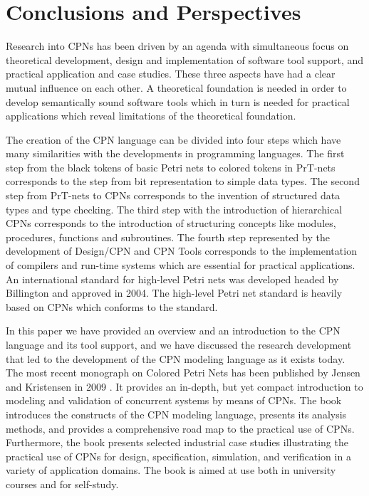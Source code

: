 \section{Conclusions and Perspectives}

Research into CPNs has been driven by an agenda with
simultaneous focus on theoretical development, design and
implementation of software tool support, and practical application and
case studies. These three aspects have had a clear mutual influence on
each other. A theoretical foundation is needed in order to develop
semantically sound software tools which in turn is needed for
practical applications which reveal limitations of the theoretical
foundation.



The creation of the CPN language can be divided into four steps which
have many similarities with the developments in programming
languages. The first step from the black tokens of basic Petri nets to
colored tokens in PrT-nets corresponds to the step from bit
representation to simple data types. The second step from PrT-nets to
CPNs corresponds to the invention of structured data types and type
checking. The third step with the introduction of hierarchical CPNs
corresponds to the introduction of structuring concepts like modules,
procedures, functions and subroutines. The fourth step represented by
the development of Design/CPN and CPN Tools corresponds to the
implementation of compilers and run-time systems which are essential
for practical applications. An international standard for high-level
Petri nets was developed headed by Billington \cite{hcpnstandard} and
approved in 2004. The high-level Petri net standard is heavily based
on CPNs which conforms to the standard.


In this paper we have provided an overview and an introduction to the
CPN language and its tool support, and we have discussed the research
development that led to the development of the CPN modeling language
as it exists today. The most recent monograph on Colored Petri Nets
has been published by Jensen and Kristensen in 2009
\cite{newcpnbook}. It provides an in-depth, but yet compact
introduction to modeling and validation of concurrent systems by means
of CPNs. The book introduces the constructs of the CPN modeling
language, presents its analysis methods, and provides a comprehensive
road map to the practical use of CPNs. Furthermore, the book presents
selected industrial case studies illustrating the practical use of
CPNs for design, specification, simulation, and verification in a
variety of application domains. The book is aimed at use both in
university courses and for self-study.

